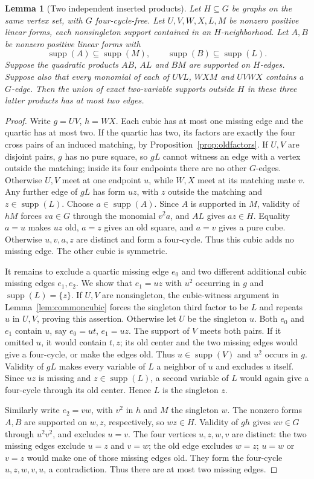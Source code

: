 \documentclass[11pt]{article}
\newcommand{\supp}{\operatorname{supp}}
\newtheorem{lemma}[theorem]{Lemma}
\theoremstyle{definition}
\theoremstyle{remark}
\begin{document}
\begin{lemma}[Two independent inserted products]\label{lem:independentproducts}
Let $H\subseteq G$ be graphs on the same vertex set, with $G$ four-cycle-free. Let $U,V,W,X,L,M$ be nonzero positive linear forms, each nonsingleton support contained in an $H$-neighborhood. Let $A,B$ be nonzero positive linear forms with
\[
 \supp(A)\subseteq\supp(M),\qquad
 \supp(B)\subseteq\supp(L).
\]
Suppose the quadratic products $AB$, $AL$ and $BM$ are supported on $H$-edges. Suppose also that every monomial of each of $UVL$, $WXM$ and $UVWX$ contains a $G$-edge. Then the union of exact two-variable supports outside $H$ in these three latter products has at most two edges.
\end{lemma}
\begin{proof}
Write $g=UV$, $h=WX$. Each cubic has at most one missing edge and the quartic has at most two. If the quartic has two, its factors are exactly the four cross pairs of an induced matching, by Proposition~\ref{prop:oldfactors}. If $U,V$ are disjoint pairs, $g$ has no pure square, so $gL$ cannot witness an edge with a vertex outside the matching; inside its four endpoints there are no other $G$-edges. Otherwise $U,V$ meet at one endpoint $u$, while $W,X$ meet at its matching mate $v$. Any further edge of $gL$ has form $uz$, with $z$ outside the matching and $z\in\supp(L)$. Choose $a\in\supp(A)$. Since $A$ is supported in $M$, validity of $hM$ forces $va\in G$ through the monomial $v^2a$, and $AL$ gives $az\in H$. Equality $a=u$ makes $uz$ old, $a=z$ gives an old square, and $a=v$ gives a pure cube. Otherwise $u,v,a,z$ are distinct and form a four-cycle. Thus this cubic adds no missing edge. The other cubic is symmetric.

It remains to exclude a quartic missing edge $e_0$ and two different additional cubic missing edges $e_1,e_2$. We show that $e_1=uz$ with $u^2$ occurring in $g$ and $\supp(L)=\{z\}$. If $U,V$ are nonsingleton, the cubic-witness argument in Lemma~\ref{lem:commoncubic} forces the singleton third factor to be $L$ and repeats $u$ in $U,V$, proving this assertion. Otherwise let $U$ be the singleton $u$. Both $e_0$ and $e_1$ contain $u$, say $e_0=ut$, $e_1=uz$. The support of $V$ meets both pairs. If it omitted $u$, it would contain $t,z$; its old center and the two missing edges would give a four-cycle, or make the edges old. Thus $u\in\supp(V)$ and $u^2$ occurs in $g$. Validity of $gL$ makes every variable of $L$ a neighbor of $u$ and excludes $u$ itself. Since $uz$ is missing and $z\in\supp(L)$, a second variable of $L$ would again give a four-cycle through its old center. Hence $L$ is the singleton $z$.

Similarly write $e_2=vw$, with $v^2$ in $h$ and $M$ the singleton $w$. The nonzero forms $A,B$ are supported on $w,z$, respectively, so $wz\in H$. Validity of $gh$ gives $uv\in G$ through $u^2v^2$, and excludes $u=v$. The four vertices $u,z,w,v$ are distinct: the two missing edges exclude $u=z$ and $v=w$; the old edge excludes $w=z$; $u=w$ or $v=z$ would make one of those missing edges old. They form the four-cycle $u,z,w,v,u$, a contradiction. Thus there are at most two missing edges.
\end{proof}
\end{document}
